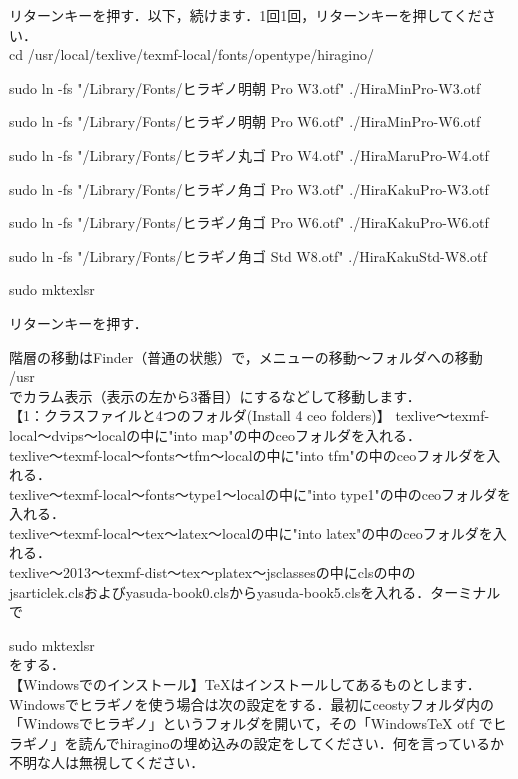 \documentclass [10pt,fleqn,b5paper]{jsarticlek}
\begin{document}
リターンキーを押す．以下，続けます．1回1回，リターンキーを押してください．\\
cd /usr/local/texlive/texmf-local/fonts/opentype/hiragino/

sudo ln -fs "/Library/Fonts/ヒラギノ明朝 Pro W3.otf" ./HiraMinPro-W3.otf

sudo ln -fs "/Library/Fonts/ヒラギノ明朝 Pro W6.otf" ./HiraMinPro-W6.otf

sudo ln -fs "/Library/Fonts/ヒラギノ丸ゴ Pro W4.otf" ./HiraMaruPro-W4.otf

sudo ln -fs "/Library/Fonts/ヒラギノ角ゴ Pro W3.otf" ./HiraKakuPro-W3.otf

sudo ln -fs "/Library/Fonts/ヒラギノ角ゴ Pro W6.otf" ./HiraKakuPro-W6.otf

sudo ln -fs "/Library/Fonts/ヒラギノ角ゴ Std W8.otf" ./HiraKakuStd-W8.otf

sudo mktexlsr

リターンキーを押す．


階層の移動はFinder（普通の状態）で，メニューの移動〜フォルダへの移動\\
/usr\\
でカラム表示（表示の左から3番目）にするなどして移動します．\\
【1：クラスファイルと4つのフォルダ(Install 4 ceo folders)】
texlive〜texmf-local〜dvips〜localの中に"into map"の中のceoフォルダを入れる．\\
texlive〜texmf-local〜fonts〜tfm〜localの中に"into tfm"の中のceoフォルダを入れる．\\
texlive〜texmf-local〜fonts〜type1〜localの中に"into type1"の中のceoフォルダを入れる．\\
texlive〜texmf-local〜tex〜latex〜localの中に"into latex"の中のceoフォルダを入れる．\\


texlive〜2013〜texmf-dist〜tex〜platex〜jsclassesの中にclsの中の\\
jsarticlek.clsおよびyasuda-book0.clsからyasuda-book5.clsを入れる．ターミナルで

sudo mktexlsr\\
をする．\\
【Windowsでのインストール】TeXはインストールしてあるものとします．\\
Windowsでヒラギノを使う場合は次の設定をする．最初にceostyフォルダ内の「{\gt Windowsでヒラギノ}」というフォルダを開いて，その「WindowsTeX otf でヒラギノ」を読んでhiraginoの埋め込みの設定をしてください．何を言っているか不明な人は無視してください．
\end{document}
